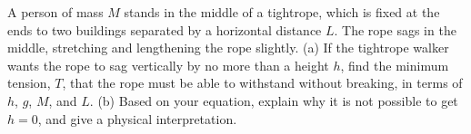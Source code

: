  A person of mass $M$ stands in the middle of a tightrope,
which is fixed at the ends to two buildings separated by a
horizontal distance $L$. The rope sags in the middle,
stretching and lengthening the rope slightly.\hwendpart
 (a) If the
tightrope walker wants the rope to sag vertically by no more
than a height $h$, find the minimum tension, $T$, that the
rope must be able to withstand without breaking, in terms of
$h$, $g$, $M$, and $L$.\answercheck\hwendpart
(b) Based on your equation, explain why it
is not possible to get $h=0$, and give a physical interpretation.
